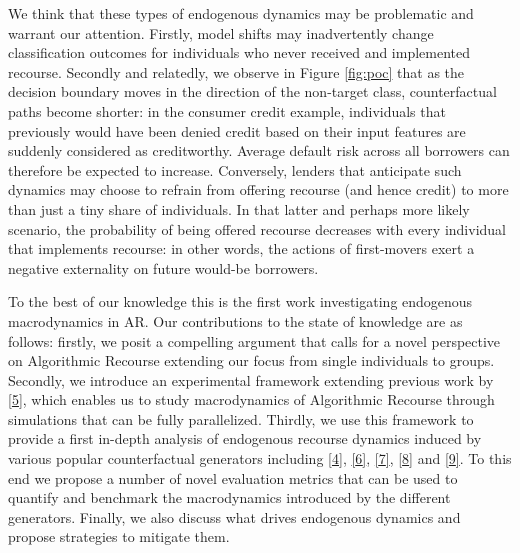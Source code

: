 \documentclass[conference,final,]{IEEEtran}
\begin{document}
We think that these types of endogenous dynamics may be problematic and warrant our attention. Firstly, model shifts may inadvertently change classification outcomes for individuals who never received and implemented recourse. Secondly and relatedly, we observe in Figure \ref{fig:poc} that as the decision boundary moves in the direction of the non-target class, counterfactual paths become shorter: in the consumer credit example, individuals that previously would have been denied credit based on their input features are suddenly considered as creditworthy. Average default risk across all borrowers can therefore be expected to increase. Conversely, lenders that anticipate such dynamics may choose to refrain from offering recourse (and hence credit) to more than just a tiny share of individuals. In that latter and perhaps more likely scenario, the probability of being offered recourse decreases with every individual that implements recourse: in other words, the actions of first-movers exert a negative externality on future would-be borrowers.

To the best of our knowledge this is the first work investigating endogenous macrodynamics in AR. Our contributions to the state of knowledge are as follows: firstly, we posit a compelling argument that calls for a novel perspective on Algorithmic Recourse extending our focus from single individuals to groups. Secondly, we introduce an experimental framework extending previous work by \protect\hyperlink{ref-altmeyer2022CounterfactualExplanations}{{[}5{]}}, which enables us to study macrodynamics of Algorithmic Recourse through simulations that can be fully parallelized. Thirdly, we use this framework to provide a first in-depth analysis of endogenous recourse dynamics induced by various popular counterfactual generators including \protect\hyperlink{ref-wachter2017counterfactual}{{[}4{]}}, \protect\hyperlink{ref-schut2021generating}{{[}6{]}}, \protect\hyperlink{ref-joshi2019towards}{{[}7{]}}, \protect\hyperlink{ref-mothilal2020explaining}{{[}8{]}} and \protect\hyperlink{ref-antoran2020getting}{{[}9{]}}. To this end we propose a number of novel evaluation metrics that can be used to quantify and benchmark the macrodynamics introduced by the different generators. Finally, we also discuss what drives endogenous dynamics and propose strategies to mitigate them.
\end{document}
